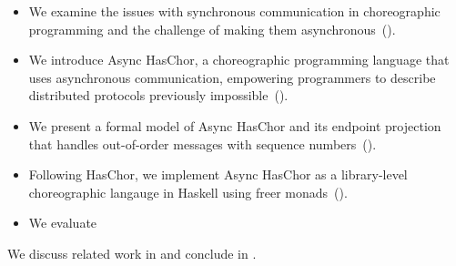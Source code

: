 \begin{itemize}
\item
    We examine the issues with synchronous communication in choreographic programming and the challenge of making them asynchronous~().
\item
    We introduce Async HasChor, a choreographic programming language that uses asynchronous communication, empowering programmers to describe distributed protocols previously impossible~().
\item
    We present a formal model of Async HasChor and its endpoint projection that handles out-of-order messages with sequence numbers~().
\item
    Following HasChor, we implement Async HasChor as a library-level choreographic langauge in Haskell using freer monads~().
\item
    We evaluate
\end{itemize}

\noindent We discuss related work in  and conclude in .
